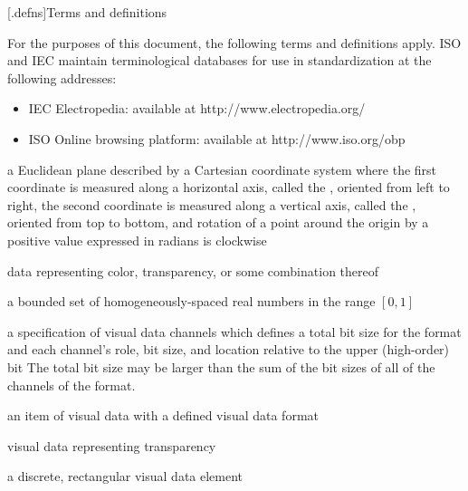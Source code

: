 
[\iotwod.defns]{Terms and definitions}

For the purposes of this document, the following terms and definitions apply.
ISO and IEC maintain terminological databases for use in standardization at the following addresses:
\begin{itemize}
\renewcommand{\labelitemi}{$\bullet$} %
\item IEC Electropedia: available at http://www.electropedia.org/
\item ISO Online browsing platform: available at http://www.iso.org/obp
\end{itemize}

a Euclidean plane described by a Cartesian coordinate system where the first coordinate is measured along a horizontal axis, called the \xaxis, oriented from left to right, the second coordinate is measured along a vertical axis, called the \yaxis, oriented from top to bottom, and rotation of a point around the origin by a positive value expressed in radians is clockwise

data representing color, transparency, or some combination thereof

a bounded set of homogeneously-spaced real numbers in the range $[0,1]$

a specification of visual data channels which defines a total bit size for the format and each channel's role, bit size, and location relative to the upper (high-order) bit
\enternote
The total bit size may be larger than the sum of the bit sizes of all of the channels of the format.
\exitnote

an item of visual data with a defined visual data format

visual data representing transparency

a discrete, rectangular visual data element

